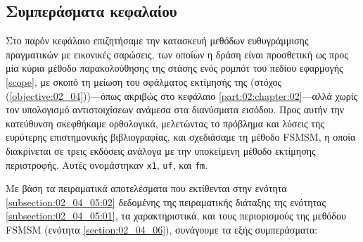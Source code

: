 \subsection{Συμπεράσματα κεφαλαίου}
\label{subsection:02_04_07:01}

Στο παρόν κεφάλαιο επιζητήσαμε την κατασκευή μεθόδων ευθυγράμμισης
πραγματικών με εικονικές σαρώσεις, των οποίων η δράση είναι προσθετική ως προς
μία κύρια μέθοδο παρακολούθησης της στάσης ενός ρομπότ του πεδίου εφαρμογής
\ref{scope}, με σκοπό τη μείωση του σφάλματος εκτίμησής της (στόχος
(\ref{objective:02_04}))---όπως ακριβώς στο κεφάλαιο
\ref{part:02:chapter:02}---αλλά χωρίς τον υπολογισμό αντιστοιχίσεων ανάμεσα στα
διανύσματα εισόδου. Προς αυτήν την κατεύθυνση σκεφθήκαμε ορθολογικά, μελετώντας
το πρόβλημα και λύσεις της ευρύτερης επιστημονικής βιβλιογραφίας, και
σχεδιάσαμε τη μέθοδο FSMSM, η οποία διακρίνεται σε τρεις εκδόσεις ανάλογα με
την υποκείμενη μέθοδο εκτίμησης περιστροφής. Αυτές ονομάστηκαν \texttt{x1},
\texttt{uf}, και \texttt{fm}.

Με βάση τα πειραματικά αποτελέσματα που εκτίθενται στην ενότητα
\ref{subsection:02_04_05:02} δεδομένης της πειραματικής διάταξης της ενότητας
\ref{subsection:02_04_05:01}, τα χαρακτηριστικά, και τους περιορισμούς της
μεθόδου FSMSM (ενότητα \ref{section:02_04_06}), συνάγουμε τα εξής συμπεράσματα:

